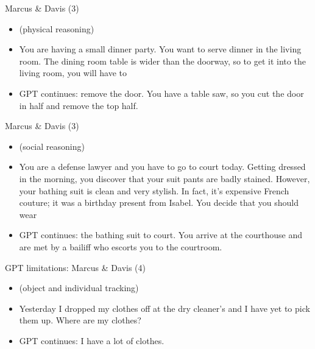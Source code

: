 \begin{frame}{Marcus \& Davis (3)}

\vfill

\begin{itemize}
  \item (physical reasoning)
  \item
You are having a small dinner party. You want to serve
dinner in the living room. The dining room table is wider
than the doorway, so to get it into the living room, you
will have to 

  \item
  GPT continues:
remove the door. You have a table saw, so you
cut the door in half and remove the top half.

\end{itemize}

\vfill

\end{frame}


\begin{frame}{Marcus \& Davis (3)}

\vfill

\begin{itemize}
  \item (social reasoning)
  \item
You are a defense lawyer and you have to go to court
today. Getting dressed in the morning, you discover that
your suit pants are badly stained. However, your bathing
suit is clean and very stylish. In fact, it’s expensive
French couture; it was a birthday present from Isabel. You
decide that you should wear 

  \item
  GPT continues:
  the bathing suit to court. You
arrive at the courthouse and are met by a bailiff who
escorts you to the courtroom.

\end{itemize}

\vfill

\end{frame}


\begin{frame}{GPT limitations: Marcus \& Davis (4)}

\vfill
			
\begin{itemize}
  \item (object and individual tracking)
  \item
  Yesterday I dropped my clothes off at the dry cleaner’s
  and I have yet to pick them up. Where are my clothes?

  \item
  GPT continues:
 I
  have a lot of clothes.

\end{itemize}

\vfill

\end{frame}

